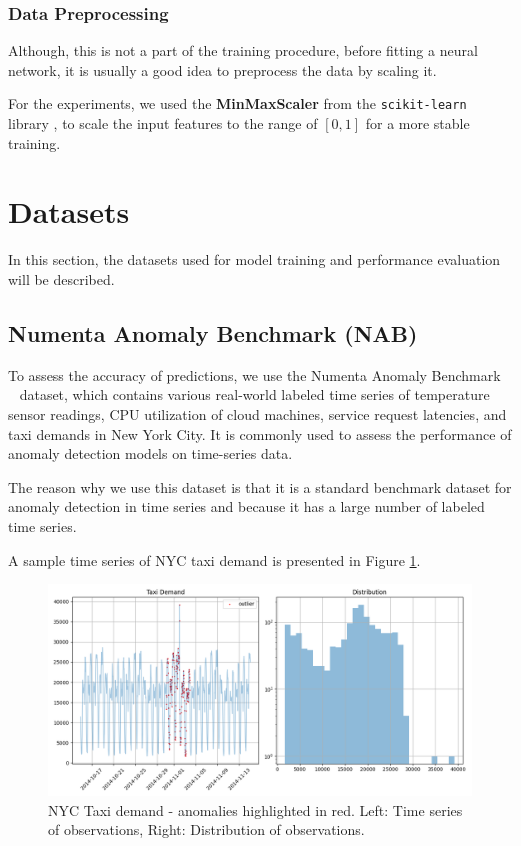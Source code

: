 \documentclass[a4paper, twoside]{report}
\theoremstyle{definition}
\numberwithin{equation}{section}
\begin{document}
\subsubsection{Data Preprocessing}

Although, this is not a part of the training procedure, before fitting
a neural network, it is usually a good idea to preprocess the data by scaling it.

For the experiments, we used the \textbf{MinMaxScaler} from the \texttt{scikit-learn} library \cite{scikit-learn},
to scale the input features to the range of $[0, 1]$ for a more stable training.


\section{Datasets} \label{sec:datasets}

In this section, the datasets used for model training and performance evaluation will be described.

\subsection{Numenta Anomaly Benchmark (NAB)}
To assess the accuracy of predictions, we use the Numenta Anomaly Benchmark ~\cite{Ahmad2017Unsupervised} dataset,
which contains various real-world labeled time series of temperature sensor readings, CPU utilization of cloud machines, service
request latencies, and taxi demands in New York City. It is commonly used to assess the performance of anomaly detection
models on time-series data.

The reason why we use this dataset is that it is a standard benchmark dataset
for anomaly detection in time series and because it has a large number of labeled time series.

A sample time series of NYC taxi demand is presented in Figure \ref{fig:NAB_example_nyc_taxi}.
\begin{figure}[h!]
    \centering
    \includegraphics[width=\textwidth]{NAB_example_nyc_taxi.png}
    \caption{NYC Taxi demand - anomalies highlighted in red. Left: Time series of observations, Right: Distribution of observations.}
    \label{fig:NAB_example_nyc_taxi}
\end{figure}
\end{document}
